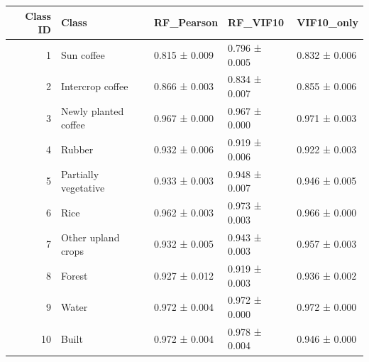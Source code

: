 \begin{tabular}{rllll}
\toprule
Class ID & Class & RF_Pearson & RF_VIF10 & VIF10_only \\
\midrule
1 & Sun coffee & 0.815 ± 0.009 & 0.796 ± 0.005 & 0.832 ± 0.006 \\
2 & Intercrop coffee & 0.866 ± 0.003 & 0.834 ± 0.007 & 0.855 ± 0.006 \\
3 & Newly planted coffee & 0.967 ± 0.000 & 0.967 ± 0.000 & 0.971 ± 0.003 \\
4 & Rubber & 0.932 ± 0.006 & 0.919 ± 0.006 & 0.922 ± 0.003 \\
5 & Partially vegetative & 0.933 ± 0.003 & 0.948 ± 0.007 & 0.946 ± 0.005 \\
6 & Rice & 0.962 ± 0.003 & 0.973 ± 0.003 & 0.966 ± 0.000 \\
7 & Other upland crops & 0.932 ± 0.005 & 0.943 ± 0.003 & 0.957 ± 0.003 \\
8 & Forest & 0.927 ± 0.012 & 0.919 ± 0.003 & 0.936 ± 0.002 \\
9 & Water & 0.972 ± 0.004 & 0.972 ± 0.000 & 0.972 ± 0.000 \\
10 & Built & 0.972 ± 0.004 & 0.978 ± 0.004 & 0.946 ± 0.000 \\
\bottomrule
\end{tabular}
